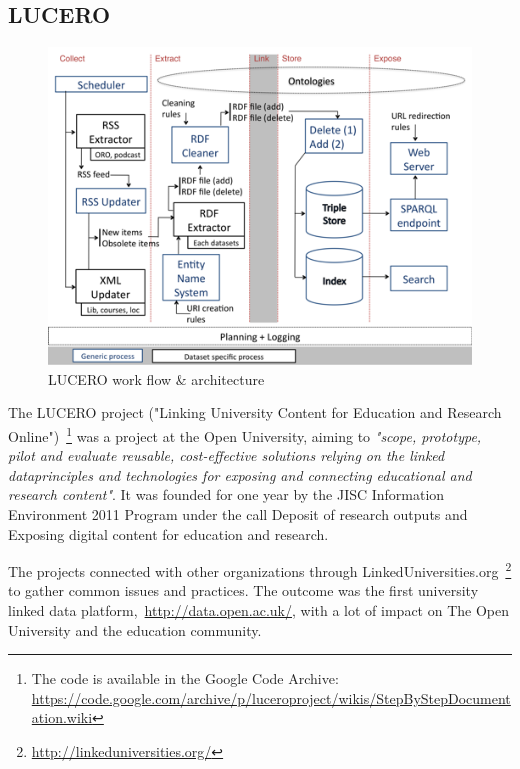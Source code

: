 \subsection{LUCERO}


\begin{figure}[htbp]
	\centering
\includegraphics[width=\textwidth]{img/lucero_architecture.png}
	\caption{LUCERO work flow \& architecture}
	\label{lucero_architecture}
\end{figure}

The LUCERO project ("Linking University Content for Education and Research Online")~\footnote{The code is available in the Google Code Archive: \url{https://code.google.com/archive/p/luceroproject/wikis/StepByStepDocumentation.wiki}} was a project at the Open University, aiming to \emph{"scope, prototype, pilot and evaluate reusable, cost-effective solutions relying on the linked dataprinciples and technologies for exposing and connecting educational and research content"}. It was founded for one year by the JISC Information Environment 2011 Program under the call Deposit of research outputs and Exposing digital content for education and research.~\cite{lucero:about}

The projects connected with other organizations through LinkedUniversities.org~\footnote{\url{http://linkeduniversities.org/}} to gather common issues and practices. The outcome was the first university linked data platform,~\url{http://data.open.ac.uk/}, with a lot of impact on The Open University and the education community.

